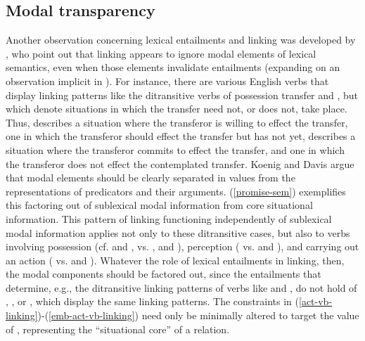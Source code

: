 \documentclass[output=paper
                ,modfonts
                ,nonflat
	        ,collection
	        ,collectionchapter
	        ,collectiontoclongg
 	        ,biblatex
                ,babelshorthands
                ,newtxmath
                ,draftmode
                ,colorlinks, citecolor=brown
]{./langsci/langscibook}
\begin{document}
\subsection{Modal transparency}
Another observation concerning lexical entailments  and linking was developed by \citet{KoenigandDavis2001}, who point out that linking appears to ignore modal elements of lexical semantics, even when those elements invalidate entailments (expanding on an observation implicit in \citealt{Goldberg1995}).
For instance, there are various English verbs that display linking patterns like the ditransitive  verbs of possession transfer  and , but which denote situations in which the transfer need not, or does not, take place.
Thus,  describes a situation where the transferor is willing to effect the transfer,  one in which the transferor should effect the transfer but has not yet,  describes a situation where the transferor commits to effect the transfer, and  one in which the transferor does not effect the contemplated transfer. 
Koenig and Davis argue that modal elements should be clearly separated in \content values from the representations of predicators and their arguments.  (\ref{promise-sem}) exemplifies this factoring out of sublexical modal information from core situational information. This pattern of linking functioning independently of sublexical modal information applies not only to these ditransitive cases, but also to verbs involving possession (cf.  and , vs. ,  and ), perception ( vs.  and ), and carrying out an action ( vs.  and ).  Whatever the role of lexical entailments in linking, then, the modal components should be factored out, since the entailments that determine, e.g., the ditransitive linking patterns of verbs like  and , do not hold of , , or , which display the same linking patterns. The constraints in (\ref{act-vb-linking})-(\ref{emb-act-vb-linking}) need only be minimally altered to target the value of , representing the ``situational core'' of a relation.
\end{document}
